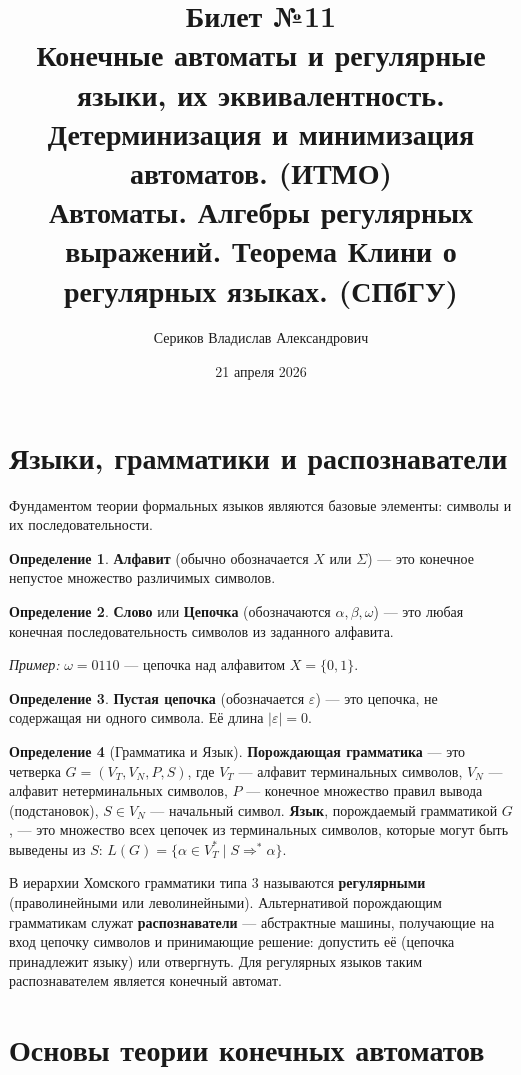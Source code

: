 \documentclass[12pt,a4paper]{article}
\title{Билет №11 \\ \small Конечные автоматы и регулярные языки, их эквивалентность. Детерминизация и минимизация автоматов. (ИТМО) \\ Автоматы. Алгебры регулярных выражений. Теорема Клини о регулярных языках. (СПбГУ)}
\author{Сериков Владислав Александрович}
\date{21 апреля 2026}
\theoremstyle{definition}
\newtheorem{definition}{Определение}
\theoremstyle{plain}
\theoremstyle{remark}
\begin{document}
\maketitle
\tableofcontents
\newpage

\section{Языки, грамматики и распознаватели}

Фундаментом теории формальных языков являются базовые элементы: символы и их последовательности.

\begin{definition}
\textbf{Алфавит} (обычно обозначается $X$ или $\Sigma$) — это конечное непустое множество различимых символов.
\end{definition}

\begin{definition}
\textbf{Слово} или \textbf{Цепочка} (обозначаются $\alpha, \beta, \omega$) — это любая конечная последовательность символов из заданного алфавита.
\end{definition}
\textit{Пример:} $\omega = 0110$ — цепочка над алфавитом $X = \{0, 1\}$.

\begin{definition}
\textbf{Пустая цепочка} (обозначается $\varepsilon$) — это цепочка, не содержащая ни одного символа. Её длина $|\varepsilon| = 0$.
\end{definition}

\begin{definition}[Грамматика и Язык]
\textbf{Порождающая грамматика} — это четверка $G = (V_T, V_N, P, S)$, где $V_T$ — алфавит терминальных символов, $V_N$ — алфавит нетерминальных символов, $P$ — конечное множество правил вывода (подстановок), $S \in V_N$ — начальный символ.
\textbf{Язык}, порождаемый грамматикой $G$, — это множество всех цепочек из терминальных символов, которые могут быть выведены из $S$: $L(G) = \{\alpha \in V_T^* \mid S \Rightarrow^* \alpha\}$.
\end{definition}

В иерархии Хомского грамматики типа 3 называются \textbf{регулярными} (праволинейными или леволинейными). Альтернативой порождающим грамматикам служат \textbf{распознаватели} — абстрактные машины, получающие на вход цепочку символов и принимающие решение: допустить её (цепочка принадлежит языку) или отвергнуть. Для регулярных языков таким распознавателем является конечный автомат.

\section{Основы теории конечных автоматов}
\end{document}
